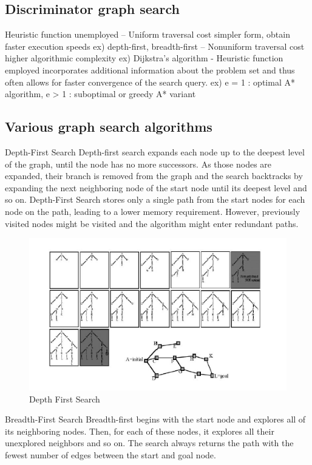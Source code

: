 \documentclass[twoside]{article}
\begin{document}
\subsection{Discriminator graph search}
Heuristic function unemployed
– Uniform traversal cost simpler form, obtain faster execution speeds 
ex) depth-first, breadth-first
– Nonuniform traversal cost higher algorithmic complexity
ex) Dijkstra’s algorithm
- Heuristic function employed incorporates additional information about the problem set and thus often allows for faster convergence of the search query.
ex) e = 1 : optimal A* algorithm, e > 1 : suboptimal or greedy A* variant

\subsection{Various graph search algorithms}
Depth-First Search
Depth-first search expands each node up to the deepest level of the graph, until the node has no more successors. As those nodes are expanded, their branch is removed from the graph and the search backtracks by expanding the next neighboring node of the start node until its deepest level and so on.
Depth-First Search stores only a single path from the start nodes for each node on the path, leading to a lower memory requirement. However, previously visited nodes might be visited and the algorithm might enter redundant paths.

\begin{figure}[h!]
\begin{center}
\includegraphics{fig15_8.PNG}
\caption{Depth First Search}
\end{center}
\end{figure}

Breadth-First Search
Breadth-first begins with the start node and explores all of its neighboring nodes. Then, for each of these nodes, it explores all their unexplored neighbors and so on.
The search always returns the path with the fewest number of edges between the start and goal node.
\end{document}

